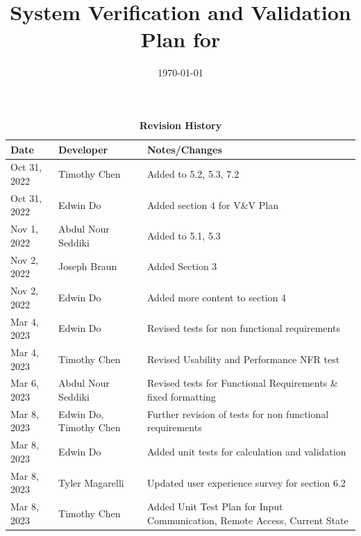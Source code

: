 \documentclass[12pt, titlepage]{article}
\begin{document}
\title{System Verification and Validation Plan for \progname{}} 
\author{\authname}
\date{\today}
	
\maketitle


\begin{table}[H]
  \caption{\bf Revision History}
  \begin{tabularx}{\textwidth}{p{2.5cm}p{2.5cm}X}
  \toprule {\bf Date} & {\bf Developer} & {\bf Notes/Changes}\\
  \midrule
  Oct 31, 2022 & Timothy Chen & Added to 5.2, 5.3, 7.2\\
  Oct 31, 2022 & Edwin Do & Added section 4 for V\&V Plan\\
  Nov 1, 2022 & Abdul Nour Seddiki & Added to 5.1, 5.3\\
  Nov 2, 2022 & Joseph Braun & Added Section 3\\
  Nov 2, 2022 & Edwin Do & Added more content to section 4 \\
  Mar 4, 2023 & Edwin Do & Revised tests for non functional requirements\\
  Mar 4, 2023 & Timothy Chen & Revised Usability and Performance NFR test\\
  Mar 6, 2023 & Abdul Nour Seddiki & Revised tests for Functional Requirements \& fixed formatting\\
  Mar 8, 2023 & Edwin Do, Timothy Chen & Further revision of tests for non functional requirements\\
  Mar 8, 2023 & Edwin Do & Added unit tests for calculation and validation\\
  Mar 8, 2023 & Tyler Magarelli & Updated user experience survey for section 6.2\\
  Mar 8, 2023 & Timothy Chen & Added Unit Test Plan for Input Communication, Remote Access, Current State\\
  \bottomrule
  \end{tabularx}
  \end{table}
  

\newpage

\tableofcontents

\listoftables


\newpage
\end{document}
